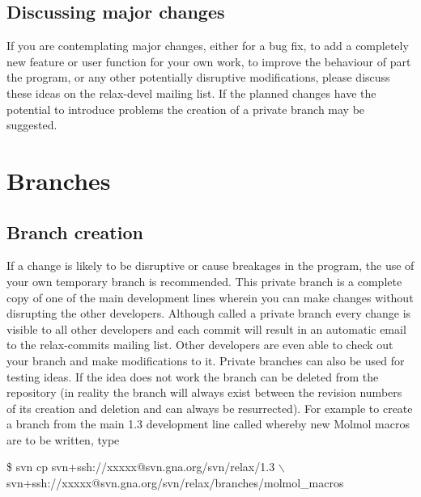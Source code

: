 \subsection{Discussing major changes}

If you are contemplating major changes, either for a bug fix, to add a completely new feature or user function for your own work, to improve the behaviour of part the program, or any other potentially disruptive modifications, please discuss these ideas on the rela\mbox{x-d}evel mailing list.  If the planned changes have the potential to introduce problems the creation of a private branch may be suggested.



\section{Branches}


\subsection{Branch creation}

If a change is likely to be disruptive or cause breakages in the program, the use of your own temporary branch is recommended.  This private branch is a complete copy of one of the main development lines wherein you can make changes without disrupting the other developers.  Although called a private branch every change is visible to all other developers and each commit will result in an automatic email to the relax-commits mailing list.  Other developers are even able to check out your branch and make modifications to it.  Private branches can also be used for testing ideas.  If the idea does not work the branch can be deleted from the repository (in reality the branch will always exist between the revision numbers of its creation and deletion and can always be resurrected).  For example to create a branch from the main 1.3 development line called  whereby new Molmol macros are to be written, type

\begin{exampleenv}
\$ svn cp svn+ssh://xxxxx@svn.gna.org/svn/relax/1.3 $\backslash$ \\
 svn+ssh://xxxxx@svn.gna.org/svn/relax/branches/molmol\_macros
\end{exampleenv}

